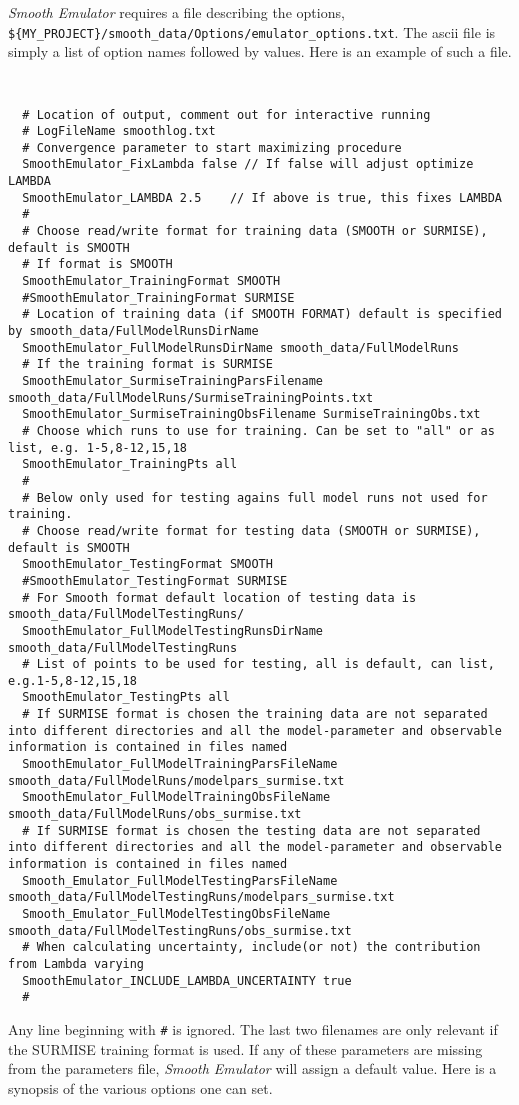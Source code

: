 \documentclass[UserManual.tex]{subfiles}
\begin{document}
{\it Smooth Emulator} requires a file describing the options,
{\tt \$\{MY\_PROJECT\}/smooth\_data/Options/emulator\_options.txt}. The ascii file is simply a list of option names followed by values. Here is an example of such a file.
{\tt
\begin{verbatim}
  # Location of output, comment out for interactive running
  # LogFileName smoothlog.txt
  # Convergence parameter to start maximizing procedure
  SmoothEmulator_FixLambda false // If false will adjust optimize LAMBDA 
  SmoothEmulator_LAMBDA 2.5    // If above is true, this fixes LAMBDA
  #
  # Choose read/write format for training data (SMOOTH or SURMISE), default is SMOOTH
  # If format is SMOOTH
  SmoothEmulator_TrainingFormat SMOOTH
  #SmoothEmulator_TrainingFormat SURMISE
  # Location of training data (if SMOOTH FORMAT) default is specified by smooth_data/FullModelRunsDirName
  SmoothEmulator_FullModelRunsDirName smooth_data/FullModelRuns
  # If the training format is SURMISE
  SmoothEmulator_SurmiseTrainingParsFilename smooth_data/FullModelRuns/SurmiseTrainingPoints.txt
  SmoothEmulator_SurmiseTrainingObsFilename SurmiseTrainingObs.txt
  # Choose which runs to use for training. Can be set to "all" or as list, e.g. 1-5,8-12,15,18
  SmoothEmulator_TrainingPts all
  #
  # Below only used for testing agains full model runs not used for training.
  # Choose read/write format for testing data (SMOOTH or SURMISE), default is SMOOTH
  SmoothEmulator_TestingFormat SMOOTH
  #SmoothEmulator_TestingFormat SURMISE
  # For Smooth format default location of testing data is smooth_data/FullModelTestingRuns/
  SmoothEmulator_FullModelTestingRunsDirName smooth_data/FullModelTestingRuns
  # List of points to be used for testing, all is default, can list, e.g.1-5,8-12,15,18
  SmoothEmulator_TestingPts all
  # If SURMISE format is chosen the training data are not separated into different directories and all the model-parameter and observable information is contained in files named
  SmoothEmulator_FullModelTrainingParsFileName smooth_data/FullModelRuns/modelpars_surmise.txt
  SmoothEmulator_FullModelTrainingObsFileName smooth_data/FullModelRuns/obs_surmise.txt
  # If SURMISE format is chosen the testing data are not separated into different directories and all the model-parameter and observable information is contained in files named
  Smooth_Emulator_FullModelTestingParsFileName smooth_data/FullModelTestingRuns/modelpars_surmise.txt
  Smooth_Emulator_FullModelTestingObsFileName smooth_data/FullModelTestingRuns/obs_surmise.txt
  # When calculating uncertainty, include(or not) the contribution from Lambda varying
  SmoothEmulator_INCLUDE_LAMBDA_UNCERTAINTY true
  #
\end{verbatim}
}
Any line beginning with {\tt \#} is ignored. The last two filenames are only relevant if the SURMISE training format is used. If any of these parameters are missing from the parameters file, {\it Smooth Emulator} will assign a default value. Here is a synopsis of the various options one can set.
\end{document}
